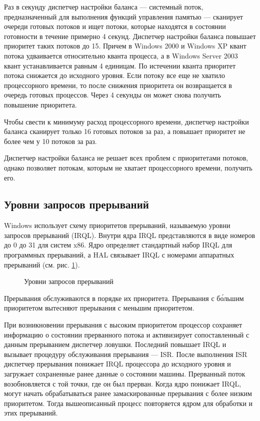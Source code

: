 \documentclass[a4paper,oneside,14pt]{extreport}
\newcommand{\img}[3]
{
	\begin{figure}[ht]
	\center{\texttt{[image: images/\#2]}}
	\caption{#3}
	\label{img:#2}
	\end{figure}
}
\begin{document}
Раз в секунду диспетчер настройки баланса --- системный поток, предназначенный для выполнения функций управления памятью --- сканирует очереди готовых потоков и ищет потоки, которые находятся в состоянии готовности в течение примерно 4 секунд. Диспетчер настройки баланса повышает приоритет таких потоков до 15. Причем в Windows 2000 и Windows XP квант потока удваивается относительно кванта процесса, а в Windows Server 2003 квант устанавливается равным 4 единицам. По истечении кванта приоритет потока снижается до исходного уровня. Если потоку все еще не хватило процессорного времени, то после снижения приоритета он возвращается в очередь готовых процессов. Через 4 секунды он может снова получить повышение приоритета.

Чтобы свести к минимуму расход процессорного времени, диспетчер настройки баланса сканирует только 16 готовых потоков за раз, а повышает приоритет не более чем у 10 потоков за раз.

Диспетчер настройки баланса не решает всех проблем с приоритетами потоков, однако позволяет потокам, которым не хватает процессорного времени, получить его.

\subsection{Уровни запросов прерываний}

Windows использует схему приоритетов прерываний, называемую уровни запросов прерываний (IRQL). Внутри ядра IRQL представляются в виде номеров до 0 до 31 для систем x86. Ядро определяет стандартный набор IRQL для программных прерываний, а HAL связывает IRQL с номерами аппаратных прерываний (см. рис. \ref{img:irql}).

\img{0.95\textwidth}{irql}{Уровни запросов прерываний}

Прерывания обслуживаются в порядке их приоритета. Прерывания с б\'{о}льшим приоритетом вытесняют прерывания с меньшим приоритетом.

При возникновении прерывания с высоким приоритетом процессор сохраняет информацию о состоянии прерванного потока и активизирует сопоставленный с данным прерыванием диспетчер ловушки. Последний повышает IRQL и вызывает процедуру обслуживания прерывания --- ISR. После выполнения ISR диспетчер прерывания понижает IRQL процессора до исходного уровня и загружает сохраненные ранее данные о состоянии машины. Прерванный поток возобновляется с той точки, где он был прерван. Когда ядро понижает IRQL, могут начать обрабатываться ранее замаскированные прерывания с более низким приоритетом. Тогда вышеописанный процесс повторяется ядром для обработки и этих прерываний.
\end{document}
